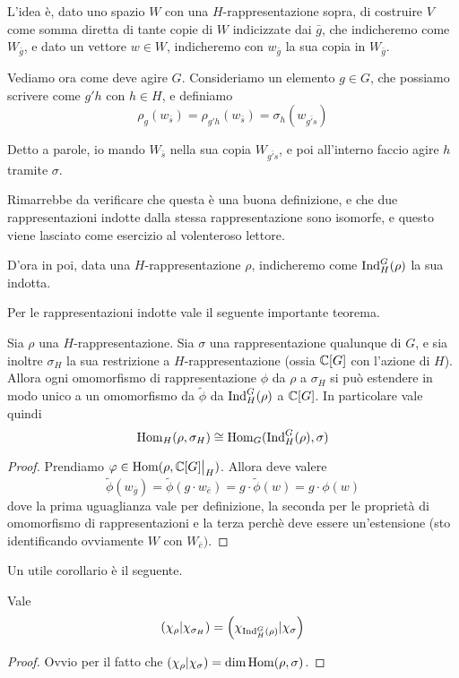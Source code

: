 		L'idea è, dato uno spazio $W$ con una $H$-rappresentazione sopra, di costruire $V$ come somma diretta di tante copie di $W$ indicizzate dai $\bar g$, che indicheremo come $W_{\bar g}$, e dato un vettore $w\in W$, indicheremo con $w_{\bar g}$ la sua copia in $W_{\bar g}$. 
		
		Vediamo ora come deve agire $G$. Consideriamo un elemento $g\in G$, che possiamo scrivere come $g'h$ con $h\in H$, e definiamo
		\[
			\rho_g(w_{\bar s}) = \rho_{g'h}(w_{\bar s})= \sigma_h(w_{\bar{g's}})
		\]
		
		Detto a parole, io mando $W_{\bar s}$ nella sua copia $W_{\bar {g's}}$, e poi all'interno faccio agire $h$ tramite $\sigma$. 
		
		Rimarrebbe da verificare che questa è una buona definizione, e che due rappresentazioni indotte dalla stessa rappresentazione sono isomorfe, e questo viene lasciato come esercizio al volenteroso lettore.
		
		D'ora in poi, data una $H$-rappresentazione $\rho$, indicheremo come $\operatorname{Ind}_H^G(\rho)$ la sua indotta.
		
		Per le rappresentazioni indotte vale il seguente importante teorema.
		\begin{mytheorem}[di Frobenius]
			Sia $\rho$ una $H$-rappresentazione. Sia $\sigma$ una rappresentazione qualunque di $G$, e sia inoltre $\sigma_H$ la sua restrizione a $H$-rappresentazione (ossia $\mathbb C[G]$ con l'azione di $H$). Allora ogni omomorfismo di rappresentazione $\phi$ da $\rho$ a $\sigma_H$ si può estendere in modo unico a un omomorfismo da $\tilde\phi$ da $\operatorname{Ind}_H^G(\rho)$ a $\mathbb C[G]$. In particolare vale quindi
			\[
				\operatorname{Hom}_H(\rho, \sigma_H) \cong \operatorname{Hom}_G(\operatorname{Ind}_H^G(\rho), \sigma)
			\]
		\end{mytheorem}
		\begin{proof}
			Prendiamo $\phi \in \Hom(\rho, \restr{\bC[G]}{H})$. Allora deve valere 
			 \[
				\tilde\phi (w_{\bar g}) = \tilde\phi(g \cdot w_{\bar e}) = g \cdot \tilde\phi(w) = g\cdot \phi (w)			  
			 \]
			dove la prima uguaglianza vale per definizione, la seconda per le proprietà di omomorfismo di rappresentazioni e la terza perchè deve essere un'estensione (sto identificando ovviamente $W$ con $W_{\bar e})$. 
		\end{proof}
		
		Un utile corollario è il seguente.
		\begin{mycor}
		 Vale 
		 \[
		  \left(\chi_\rho | \chi_{\sigma_H}\right) = \left(\chi_{\operatorname{Ind}_H^G(\rho)} | \chi_\sigma\right)
		 \]

		\end{mycor}
		\begin{proof}
			Ovvio per il fatto che $\left(\chi_\rho | \chi_\sigma\right)=\dim \operatorname{Hom} (\rho,\sigma)$.
		\end{proof}
		
